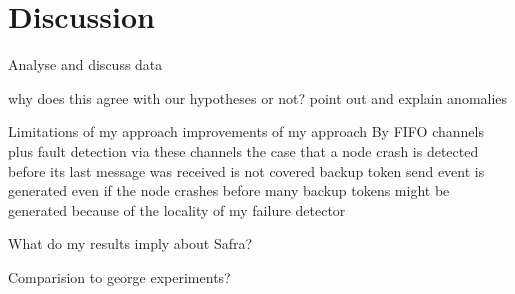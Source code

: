 \section{Discussion}

Analyse and discuss data

why does this agree with our hypotheses or not?
  point out and explain anomalies
  
Limitations of my approach
  improvements of my approach
  By FIFO channels plus fault detection via these channels the case that a node crash is detected before its last message was received is not covered
  backup token send event is generated even if the node crashes before
  many backup tokens might be generated because of the locality of my failure detector
  
What do my results imply about Safra?
  
  
  
Comparision to george experiments?